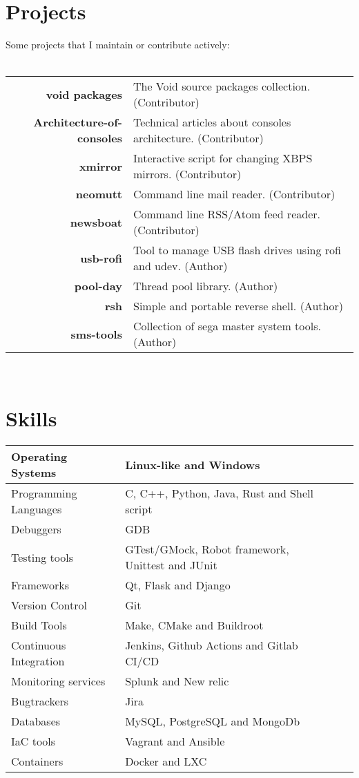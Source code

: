 \documentclass[a4paper,10pt]{article}
\begin{document}
\section{Projects}
\footnotesize{Some projects that I maintain or contribute actively:}\\ \\
\begin{tabular}{rl}
  \textbf{void packages}& The Void source packages collection. (Contributor)\\
  \textbf{Architecture-of-consoles}& Technical articles about consoles architecture. (Contributor)\\
  \textbf{xmirror}& Interactive script for changing XBPS mirrors. (Contributor)\\
  \textbf{neomutt}& Command line mail reader. (Contributor)\\
  \textbf{newsboat}& Command line RSS/Atom feed reader. (Contributor)\\
  \textbf{usb-rofi}& Tool to manage USB flash drives using rofi and udev. (Author)\\
  \textbf{pool-day}& Thread pool library. (Author)\\
  \textbf{rsh}& Simple and portable reverse shell. (Author)\\
  \textbf{sms-tools}& Collection of sega master system tools. (Author)\\
\end{tabular} \\

\section{Skills}
\begin{center}
  \begin{tabular}{| l | l | l | l |}
    \hline
    Operating Systems & Linux-like and Windows\\ \hline
    Programming Languages & C, C++, Python, Java, Rust and Shell script\\ \hline
    Debuggers & GDB \\ \hline
    Testing tools & GTest/GMock, Robot framework, Unittest and JUnit\\ \hline
    Frameworks & Qt, Flask and Django\\ \hline
    Version Control & Git\\ \hline
    Build Tools & Make, CMake and Buildroot\\ \hline
    Continuous Integration & Jenkins, Github Actions and Gitlab CI/CD\\ \hline
    Monitoring services & Splunk and New relic\\ \hline
    Bugtrackers & Jira\\ \hline
    Databases & MySQL, PostgreSQL and MongoDb\\ \hline
    IaC tools & Vagrant and Ansible\\ \hline
    Containers & Docker and LXC\\ \hline
  \end{tabular}
\end{center}
\end{document}

